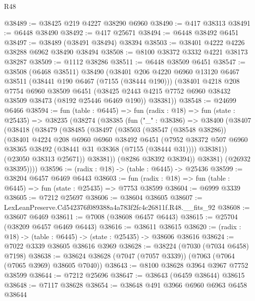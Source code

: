 \begin{lexlean}{R48}
\begin{coremodule}
@38489 := @38425 @219 @4227 @38290 @6960
@38490 := @417 @38313
@38491 := @6448 @38490
@38492 := @417 @25671
@38494 := @6448 @38492 @6451
@38497 := @38489 (@38491 @38494) @38394
@38503 := @38401 @4222 @4226 @38288 @6962 @38490 @38494
@38508 := @8100 @38372 @3332 @4221 @38173 @38287
@38509 := @1112 @38286
@38511 := @6448 @38509 @6451
@38547 := @38508
    (@6468 @38511)
    @38490
    (@38401
      @206
      @4220
      @6960
      @13120
      @6467
      @38511
      (@38441 @190 @6467 (@7155 (@38444 @190)))
      (@38401
        @4218
        @208
        @7754
        @6960
        @38509
        @6451
        (@38425 @2443 @4215 @7752 @6960 @38432 @38509 @38473 (@8192 @25446 @6469 @190))
        @38381))
@38548 := @24699 @6466
@38594 := fun (table : @6445) =>
  fun (radix : @18) =>
  fun (state : @25435) =>
  @38235
    (@38274
      (@38385
        (fun ("_" : @38386) =>
        @38400
          (@38407
            (@38418
              (@38479
                (@38485
                  (@38497
                    (@38503
                      (@38547 (@38548 @38286))
                      (@38401
                        @4224
                        @208
                        @6960
                        @6960
                        @38492
                        @6451
                        (@7952
                          @38372
                          @507
                          @6960
                          @38365
                          @38492
                          (@38441 @31 @38368 (@7155 (@38444 @31))))
                        @38381))
                    (@23050 @38313 @25671))
                  @38381))
              (@8286 @38392 @38394))
            @38381)
          (@26932 @38395))))
@38596 := (radix : @18) -> (table : @6445) -> @25436
@38599 := @38204 @6457 @6469 @6443
@38603 := fun (radix : @18) => fun (table : @6445) => fun (state : @25435) => @7753 @38599
@38604 := @6999 @3339
@38605 := @7212 @25697
@38606 := @38604 @38605
@38607 := LexLeanPreserve.Cd542376f089388a4a783f2fc4c26811f.R48.__fits_92
@38608 := @38607 @6469
@38611 := @7008 (@38608 @6457 @6443)
@38615 := @25704 (@38209 @6457 @6469 @6443)
@38616 := @38611 @38615
@38620 := (radix : @18) -> (table : @6445) -> (state : @25435) -> @38606 @38616
@38624 := @7022 @3339 @38605 @38616 @3969
@38628 := @38224 (@7030 (@7034 @6458) @7198)
@38638 := @38624 @38628 (@7047 (@7057 @3339)) (@7063 (@7064 (@7065 @3969) @38605 @7040))
@38643 := @8100 @38628 @3964 @3967 @7752 @38599
@38644 := @7212 @25696
@38647 := @38643 (@6459 @38644) @38615
@38648 := @7117 @38628
@38654 := @38648 @491 @3966 @6960 @6963 @6458 @38644

\end{coremodule}
\end{lexlean}
